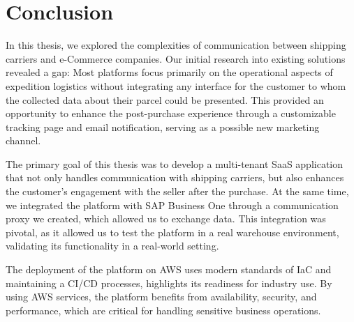 \chapter*{Conclusion}




In this thesis, we explored the complexities of communication between shipping carriers and e-Commerce companies.
Our initial research into existing solutions revealed a gap: Most platforms focus primarily on the operational aspects of expedition logistics without integrating any interface for the customer to whom the collected data about their parcel could be presented.
This provided an opportunity to enhance the post-purchase experience through a customizable tracking page and email notification, serving as a possible new marketing channel.

The primary goal of this thesis was to develop a multi-tenant \ac{SaaS} application that not only handles communication with shipping carriers, but also enhances the customer's engagement with the seller after the purchase. 
At the same time, we integrated the platform with SAP Business One through a communication proxy we created, which allowed us to exchange data.
This integration was pivotal, as it allowed us to test the platform in a real warehouse environment, validating its functionality in a real-world setting.

The deployment of the platform on \ac{AWS} uses modern standards of \ac{IaC} and maintaining a \ac{CI}/\ac{CD} processes, highlights its readiness for industry use.
By using AWS services, the platform benefits from availability, security, and performance, which are critical for handling sensitive business operations.


